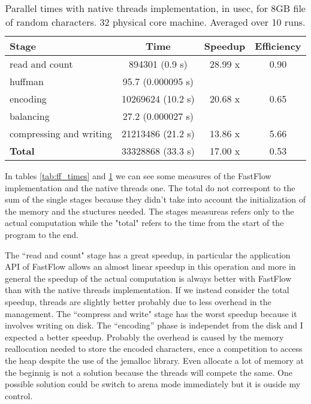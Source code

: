 \documentclass[12pt, letterpaper]{article}
\begin{document}
\begin{table}[h]
\begin{center}
\begin{tabular}{l c c c}
    \textbf{Stage} & \textbf{Time} & \textbf{Speedup} & \textbf{Efficiency}  \\
    \hline
    read and count & 894301 (0.9 s) & 28.99 x & 0.90  \\
    \hline
    huffman & 95.7 (0.000095 s) & \\
    \hline
    encoding & 10269624  (10.2 s) & 20.68 x & 0.65 \\
    \hline
    balancing & 27.2 (0.000027 s) & \\
    \hline
    compressing and writing & 21213486  (21.2 s) & 13.86 x & 5.66\\
    \hline
    \textbf{Total} & 33328868 (33.3 s) & 17.00 x & 0.53 \\ 
\end{tabular}
\caption{Parallel times with native threads implementation, in usec, for 8GB file of random characters. 32 physical core machine. Averaged over 10 runs.}    
\label{tab:thr_times}
\end{center}
\end{table}

In tables \ref{tab:ff_times} and \ref{tab:thr_times} we can see some measures of the FastFlow implementation and the native threads one. The total do not correspont to the sum of the single stages because they didn't take into account the initialization of the memory and the stuctures needed. The stages measureas refers only to the actual computation while the "total" refers to the time from the start of the program to the end.

The ``read and count" stage has a great speedup, in particular the application API of FastFlow allows an almost linear speedup in this operation and more in general the speedup of the actual computation is always better with FastFlow than with the native threads implementation. If we instead consider the total speedup, threads are slightly better probably due to less overhead in the management. The ``compress and write" stage has the worst speedup because it involves writing on disk. The ``encoding'' phase is independet from the disk and I expected a better speedup. Probably the overhead is caused by the memory reallocation needed to store the encoded characters, ence a competition to access the heap despite the use of the jemalloc library. Even allocate a lot of memory at the beginnig is not a solution because the threads will compete the same. One possible solution could be switch to arena mode immediately but it is ouside my control.







\newpage \FloatBarrier


\end{document}
